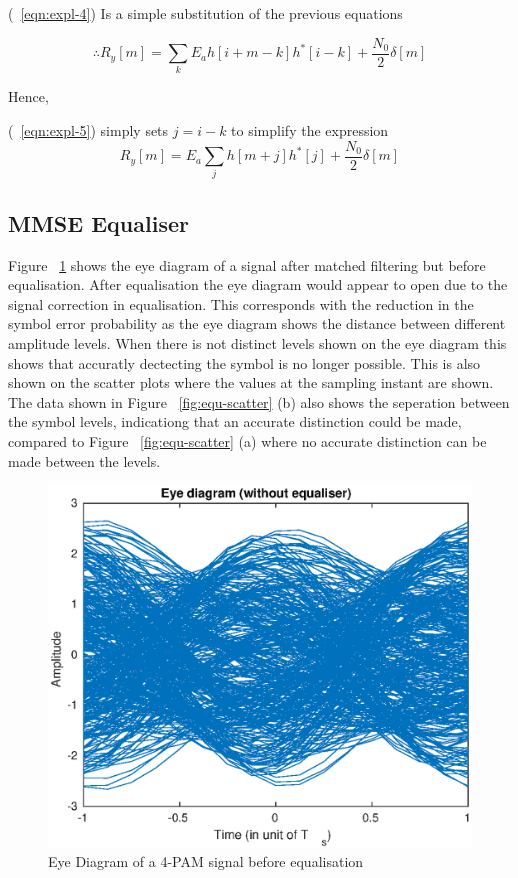 (~\ref{eqn:expl-4}) Is a simple substitution of the previous equations

\begin{equation}
    \label{eqn:expl-4}
    \therefore R_y[m] = \sum_k E_a h[i+m-k]h^*[i-k]+ \frac{N_0}{2}\delta [m]
\end{equation}

Hence,

(~\ref{eqn:expl-5}) simply sets $j=i-k$ to simplify the expression
\begin{equation}
    \label{eqn:expl-5}
    R_y[m] = E_a \sum_j h[m+j]h^*[j] + \frac{N_0}{2} \delta [m]
\end{equation}

\subsection{MMSE Equaliser}

Figure ~\ref{fig:equ-eye} shows the eye diagram of a signal after matched filtering but before equalisation. After equalisation
the eye diagram would appear to open due to the signal correction in equalisation. This corresponds with the reduction in the
symbol error probability as the eye diagram shows the distance between different amplitude levels. When there is not distinct levels
shown on the eye diagram this shows that accuratly dectecting the symbol is no longer possible. This is also shown on the scatter plots 
where the values at the sampling instant are shown. The data shown in Figure ~\ref{fig:equ-scatter} (b) also shows the seperation
between the symbol levels, indicationg that an accurate distinction could be made, compared to Figure ~\ref{fig:equ-scatter} (a)
where no accurate distinction can be made between the levels.

\begin{figure}[H]
    \begin{center}
        \includegraphics{Equaliser/eye}
    \end{center}
    \caption{Eye Diagram of a 4-PAM signal before equalisation}
    \label{fig:equ-eye}
\end{figure}

